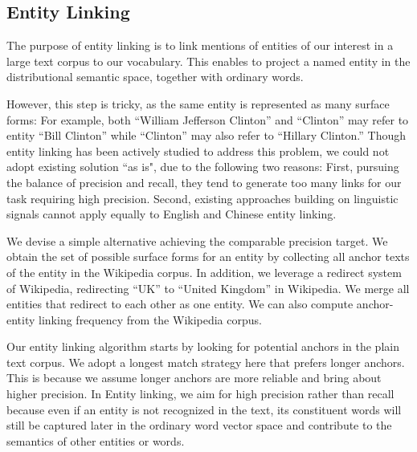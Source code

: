 
\subsection{Entity Linking}
\label{sec:el}

The purpose of entity linking is to link mentions of entities of
our interest in a large text corpus to our vocabulary.
This enables to project a named entity in the distributional semantic space,
together with ordinary words.

However, this step is tricky, as the same entity is represented as many
surface forms:
 For example,
both ``William Jefferson Clinton'' and ``Clinton'' may refer to entity
``Bill Clinton'' while ``Clinton'' may also refer to ``Hillary Clinton.''
Though entity linking has been actively studied to address this problem, we could not
adopt existing solution ``as is", due to the following two reasons:
First, pursuing the balance of precision and recall, they tend to generate too many links
for our task requiring high precision.
Second, existing approaches building on linguistic signals cannot apply equally to English and Chinese entity linking.

We devise a simple alternative achieving the comparable precision target.
We obtain the set of possible surface forms for an entity by
collecting all anchor texts of the entity in the Wikipedia corpus.
In addition, we leverage a redirect system of Wikipedia,
redirecting ``UK'' to ``United Kingdom'' in Wikipedia.
We merge all entities that redirect to each other as one entity.
We can also compute anchor-entity linking frequency from
the Wikipedia corpus.

Our entity linking algorithm starts by looking for potential anchors
in the plain text corpus. We adopt a longest match strategy here that
prefers longer anchors. This is because we assume
longer anchors are more reliable and bring about higher precision.
In Entity linking, we aim for high precision rather than recall because
even if an entity is not recognized in the text, its constituent words
will still be captured later in the ordinary word vector space and
contribute to the semantics of other entities or words.

